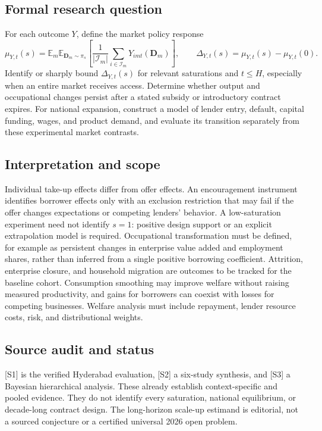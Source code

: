 \documentclass[11pt,a4paper]{article}
\begin{document}
\subsection*{Formal research question}
For each outcome $Y$, define the market policy response
\[
 \mu_{Y,t}(s)=\mathbb E_m\mathbb E_{\mathbf D_m\sim\pi_s}
          \left[\frac1{|\mathcal I_m|}\sum_{i\in\mathcal I_m}
                    Y_{imt}(\mathbf D_m)\right],
 \qquad \Delta_{Y,t}(s)=\mu_{Y,t}(s)-\mu_{Y,t}(0).
\]
Identify or sharply bound $\Delta_{Y,t}(s)$ for relevant saturations and $t\leq H$, especially when an entire market receives access. Determine whether output and occupational changes persist after a stated subsidy or introductory contract expires. For national expansion, construct a model of lender entry, default, capital funding, wages, and product demand, and evaluate its transition separately from these experimental market contrasts.
\subsection*{Interpretation and scope}
Individual take-up effects differ from offer effects. An encouragement instrument identifies borrower effects only with an exclusion restriction that may fail if the offer changes expectations or competing lenders' behavior. A low-saturation experiment need not identify $s=1$: positive design support or an explicit extrapolation model is required. Occupational transformation must be defined, for example as persistent changes in enterprise value added and employment shares, rather than inferred from a single positive borrowing coefficient. Attrition, enterprise closure, and household migration are outcomes to be tracked for the baseline cohort. Consumption smoothing may improve welfare without raising measured productivity, and gains for borrowers can coexist with losses for competing businesses. Welfare analysis must include repayment, lender resource costs, risk, and distributional weights.
\subsection*{Source audit and status}
[S1] is the verified Hyderabad evaluation, [S2] a six-study synthesis, and [S3] a Bayesian hierarchical analysis. These already establish context-specific and pooled evidence. They do not identify every saturation, national equilibrium, or decade-long contract design. The long-horizon scale-up estimand is editorial, not a sourced conjecture or a certified universal 2026 open problem.
\end{document}
